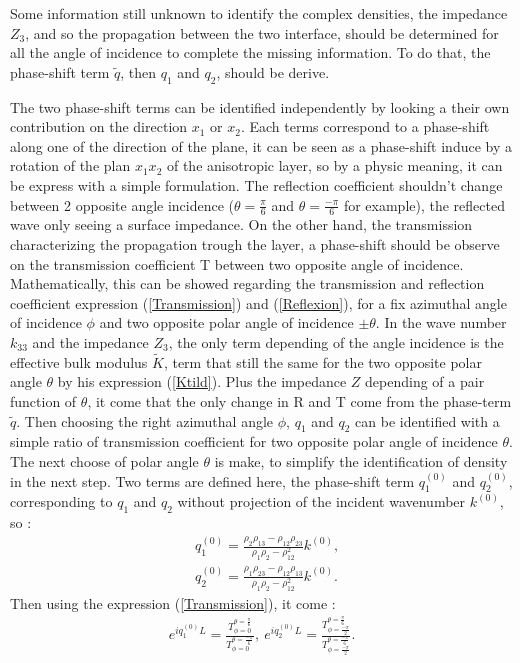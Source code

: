 \documentclass{article}
\begin{document}
    Some information still unknown to identify the complex densities, the impedance $Z_3$, and so the propagation between the two interface, should be determined for all the angle of incidence to complete the missing information. To do that, the phase-shift term $\tilde{q}$, then $q_1$ and $q_2$, should be derive. 
    
    The two phase-shift terms can be identified independently by looking a their own contribution on the direction $x_1$ or $x_2$. Each terms correspond to a phase-shift along one of the direction of the plane, it can be seen as a phase-shift induce by a rotation of the plan $x_1x_2$ of the anisotropic layer, so by a physic meaning, it can be express with a simple formulation. The reflection coefficient shouldn't change between 2 opposite angle incidence ($\theta=\frac{\pi}{6}$ and $\theta=\frac{-\pi}{6}$ for example), the reflected wave only seeing a surface impedance. On the other hand, the transmission characterizing the propagation trough the layer, a phase-shift should be observe on the transmission coefficient T between two opposite angle of incidence. Mathematically, this can be showed regarding the transmission and reflection coefficient expression (\ref{Transmission}) and (\ref{Reflexion}), for a fix azimuthal angle of incidence $\phi$ and two opposite polar angle of incidence $\pm \theta$. In the wave number $k_{33}$ and the impedance $Z_3$, the only term depending of the angle incidence is the effective bulk modulus $\tilde{K}$, term that still the same for the two opposite polar angle $\theta$ by his expression (\ref{Ktild}). Plus the impedance $Z$ depending of a pair function of $\theta$, it come that the only change in R and T come from the phase-term $\tilde{q}$. Then choosing the right azimuthal angle $\phi$, $q_1$ and $q_2$ can be identified with a simple ratio of transmission coefficient for two opposite polar angle of incidence $\theta$. The next choose of polar angle $\theta$ is make, to simplify the identification of density in the next step. Two terms are defined here, the phase-shift term $q_1^{(0)}$ and $q_2^{(0)}$, corresponding to $q_1$ and $q_2$ without projection of the incident wavenumber $k^{(0)}$, so :
    \begin{align}
        &q_1^{(0)}=\frac{\rho_2\rho_{13}-\rho_{12}\rho_{23}}{\rho_1\rho_2-\rho_{12}^2}k^{(0)},\\
        &q_2^{(0)}=\frac{\rho_1\rho_{23}-\rho_{12}\rho_{13}}{\rho_1\rho_2-\rho_{12}^2}k^{(0)}.
    \end{align}
    Then using the expression (\ref{Transmission}), it come :
    \begin{align}
     e^{iq_1^{(0)}L}=\frac{T^{\theta=\frac{\pi}{6}}_{\phi=0}}{T^{\theta=\frac{-\pi}{6}}_{\phi=0}},\ e^{iq_2^{(0)}L}=\frac{T^{\theta=\frac{\pi}{6}}_{\phi=\frac{-\pi}{2}}}{T^{\theta=\frac{-\pi}{6}}_{\phi=\frac{-\pi}{2}}}. 
    \end{align}
    
\end{document}
